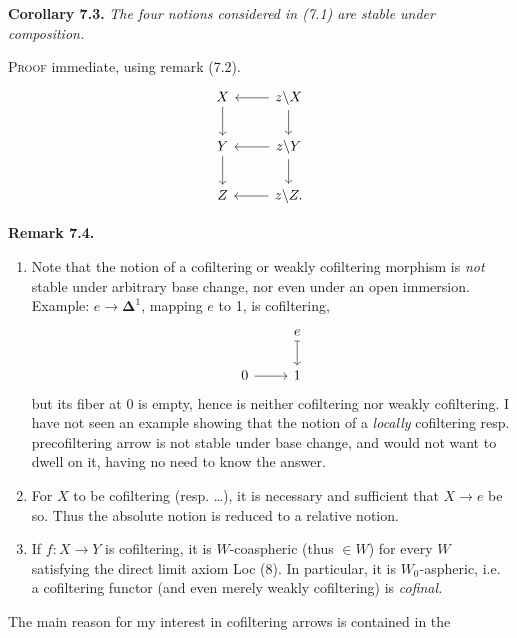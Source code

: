 \documentclass[11pt]{article}
\newcommand{\printedpage}[1]{\marginpar{\footnotesize p.~#1}}
\newcommand{\msp}[1]{\marginpar{\footnotesize [#1]}}
\begin{document}
\textbf{Corollary 7.3.} \textit{The four notions considered in (7.1) are stable under composition.}

\textsc{Proof} immediate, using remark (7.2).
\[
\begin{tikzcd}
X \arrow[d] & z\backslash X \arrow[l] \arrow[d] \\
Y \arrow[d] & z\backslash Y \arrow[l] \arrow[d] \\
Z & z\backslash Z. \arrow[l]
\end{tikzcd}
\]

\printedpage{57}
\textbf{Remark 7.4.}
\begin{enumerate}
\item[1)] Note that the notion of a cofiltering or weakly cofiltering morphism is \textit{not} stable under arbitrary base change, nor even under an open immersion. Example: $e \longrightarrow \boldsymbol{\Delta}^1$, mapping $e$ to 1, is cofiltering,
\[
\begin{tikzcd}
 & e \arrow[d, mapsto] \\
0 \arrow[r] & 1
\end{tikzcd}
\]
but its fiber at 0 is empty, hence is neither cofiltering nor weakly cofiltering. I have not seen an example showing that the notion of a \textit{locally} cofiltering resp. precofiltering arrow is not stable under base change, and would not want to dwell on it, having no need to know the answer.
\item[2)] For $X$ to be cofiltering (resp. \dots), it is necessary and sufficient that $X \longrightarrow e$ be so. Thus the absolute notion is reduced to a relative notion.
\item[3)] If $f : X \longrightarrow Y$ is cofiltering, it is \msp{page 92} $W$-coaspheric (thus $\in W$) for every $W$ satisfying the direct limit axiom Loc (8). In particular, it is $W_0$-aspheric, i.e. a cofiltering functor (and even merely weakly cofiltering) is \textit{cofinal.}
\end{enumerate}
The main reason for my interest in cofiltering arrows is contained in the
\end{document}
